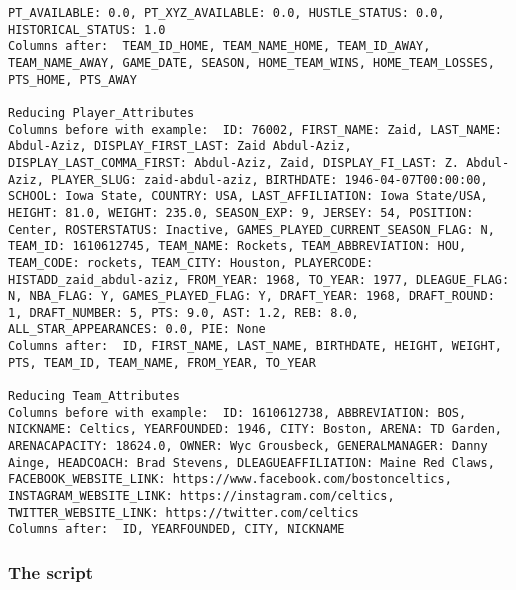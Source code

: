 \documentclass{article}
\begin{document}
\begin{lstlisting}
PT_AVAILABLE: 0.0, PT_XYZ_AVAILABLE: 0.0, HUSTLE_STATUS: 0.0, HISTORICAL_STATUS: 1.0
Columns after:  TEAM_ID_HOME, TEAM_NAME_HOME, TEAM_ID_AWAY, TEAM_NAME_AWAY, GAME_DATE, SEASON, HOME_TEAM_WINS, HOME_TEAM_LOSSES, PTS_HOME, PTS_AWAY 

Reducing Player_Attributes 
Columns before with example:  ID: 76002, FIRST_NAME: Zaid, LAST_NAME: Abdul-Aziz, DISPLAY_FIRST_LAST: Zaid Abdul-Aziz, DISPLAY_LAST_COMMA_FIRST: Abdul-Aziz, Zaid, DISPLAY_FI_LAST: Z. Abdul-Aziz, PLAYER_SLUG: zaid-abdul-aziz, BIRTHDATE: 1946-04-07T00:00:00, SCHOOL: Iowa State, COUNTRY: USA, LAST_AFFILIATION: Iowa State/USA, HEIGHT: 81.0, WEIGHT: 235.0, SEASON_EXP: 9, JERSEY: 54, POSITION: Center, ROSTERSTATUS: Inactive, GAMES_PLAYED_CURRENT_SEASON_FLAG: N, TEAM_ID: 1610612745, TEAM_NAME: Rockets, TEAM_ABBREVIATION: HOU, TEAM_CODE: rockets, TEAM_CITY: Houston, PLAYERCODE: HISTADD_zaid_abdul-aziz, FROM_YEAR: 1968, TO_YEAR: 1977, DLEAGUE_FLAG: N, NBA_FLAG: Y, GAMES_PLAYED_FLAG: Y, DRAFT_YEAR: 1968, DRAFT_ROUND: 1, DRAFT_NUMBER: 5, PTS: 9.0, AST: 1.2, REB: 8.0, ALL_STAR_APPEARANCES: 0.0, PIE: None
Columns after:  ID, FIRST_NAME, LAST_NAME, BIRTHDATE, HEIGHT, WEIGHT, PTS, TEAM_ID, TEAM_NAME, FROM_YEAR, TO_YEAR 

Reducing Team_Attributes 
Columns before with example:  ID: 1610612738, ABBREVIATION: BOS, NICKNAME: Celtics, YEARFOUNDED: 1946, CITY: Boston, ARENA: TD Garden, ARENACAPACITY: 18624.0, OWNER: Wyc Grousbeck, GENERALMANAGER: Danny Ainge, HEADCOACH: Brad Stevens, DLEAGUEAFFILIATION: Maine Red Claws, FACEBOOK_WEBSITE_LINK: https://www.facebook.com/bostonceltics, INSTAGRAM_WEBSITE_LINK: https://instagram.com/celtics, TWITTER_WEBSITE_LINK: https://twitter.com/celtics
Columns after:  ID, YEARFOUNDED, CITY, NICKNAME 
\end{lstlisting}

\subsubsection*{The script}
\end{document}
